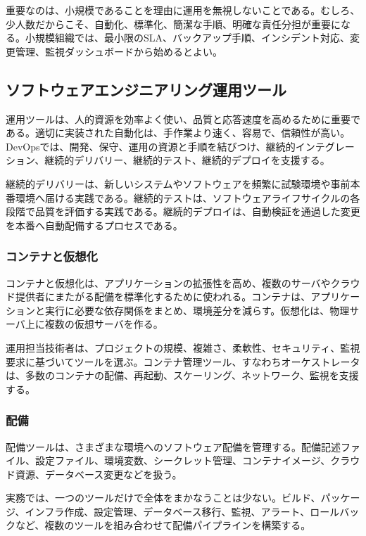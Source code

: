 \documentclass[a4paper,11pt]{ltjsarticle}
\numberwithin{figure}{section}
\numberwithin{table}{section}
\begin{document}
重要なのは、小規模であることを理由に運用を無視しないことである。むしろ、少人数だからこそ、自動化、標準化、簡潔な手順、明確な責任分担が重要になる。小規模組織では、最小限のSLA、バックアップ手順、インシデント対応、変更管理、監視ダッシュボードから始めるとよい。

\subsection{ソフトウェアエンジニアリング運用ツール}

運用ツールは、人的資源を効率よく使い、品質と応答速度を高めるために重要である。適切に実装された自動化は、手作業より速く、容易で、信頼性が高い。DevOpsでは、開発、保守、運用の資源と手順を結びつけ、継続的インテグレーション、継続的デリバリー、継続的テスト、継続的デプロイを支援する。

継続的デリバリーは、新しいシステムやソフトウェアを頻繁に試験環境や事前本番環境へ届ける実践である。継続的テストは、ソフトウェアライフサイクルの各段階で品質を評価する実践である。継続的デプロイは、自動検証を通過した変更を本番へ自動配備するプロセスである。

\subsubsection{コンテナと仮想化}

コンテナと仮想化は、アプリケーションの拡張性を高め、複数のサーバやクラウド提供者にまたがる配備を標準化するために使われる。コンテナは、アプリケーションと実行に必要な依存関係をまとめ、環境差分を減らす。仮想化は、物理サーバ上に複数の仮想サーバを作る。

運用担当技術者は、プロジェクトの規模、複雑さ、柔軟性、セキュリティ、監視要求に基づいてツールを選ぶ。コンテナ管理ツール、すなわちオーケストレータは、多数のコンテナの配備、再起動、スケーリング、ネットワーク、監視を支援する。

\subsubsection{配備}

配備ツールは、さまざまな環境へのソフトウェア配備を管理する。配備記述ファイル、設定ファイル、環境変数、シークレット管理、コンテナイメージ、クラウド資源、データベース変更などを扱う。

実務では、一つのツールだけで全体をまかなうことは少ない。ビルド、パッケージ、インフラ作成、設定管理、データベース移行、監視、アラート、ロールバックなど、複数のツールを組み合わせて配備パイプラインを構築する。
\end{document}
